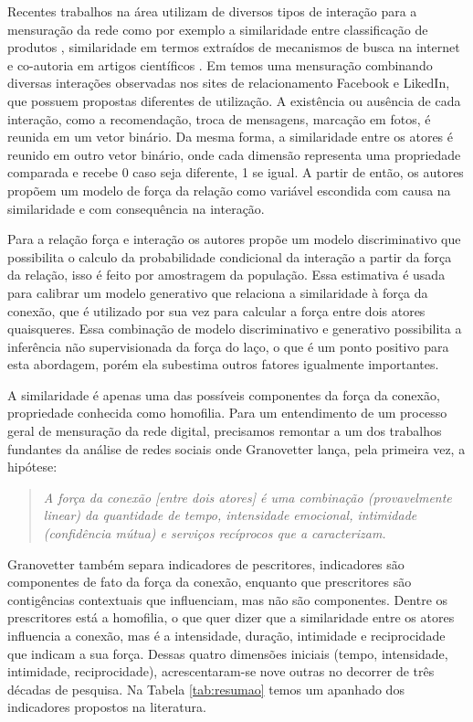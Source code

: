 \documentclass{article}
\begin{document}
Recentes trabalhos na área utilizam de diversos tipos de interação para a
mensuração da rede como por exemplo a similaridade entre classificação de
produtos \cite{Richardson2002}, similaridade em termos extraídos de mecanismos de
busca na internet \cite{MATSUO2007} e co-autoria em artigos científicos
\cite{Kempe2003}. Em \cite{Xiang2010} temos uma mensuração combinando diversas
interações observadas nos sites de relacionamento Facebook e LikedIn, que
possuem propostas diferentes de utilização. A existência ou ausência de cada
interação, como a recomendação, troca de mensagens, marcação em fotos, é reunida
em um vetor binário. Da mesma forma, a similaridade entre os atores é reunido em
outro vetor binário, onde cada dimensão representa uma propriedade comparada e
recebe 0 caso seja diferente, 1 se igual. A partir de então, os autores propõem
um modelo de força da relação como variável escondida com causa na similaridade
e com consequência na interação. 

Para a relação força e interação os autores propõe um modelo discriminativo que
possibilita o calculo da probabilidade condicional da interação a partir da
força da relação, isso é feito por amostragem da população. Essa estimativa é
usada para calibrar um modelo generativo que relaciona a similaridade à força da
conexão, que é utilizado por sua vez para calcular a força entre dois atores
quaisqueres. Essa combinação de modelo discriminativo e generativo possibilita a
inferência não supervisionada da força do laço, o que é um ponto positivo para
esta abordagem, porém ela subestima outros fatores igualmente importantes.

A similaridade é apenas uma das possíveis componentes da força da conexão,
propriedade conhecida como homofilia. Para um entendimento de um processo geral
de mensuração da rede digital, precisamos remontar a um dos trabalhos fundantes
da análise de redes sociais onde Granovetter lança, pela primeira vez, a
hipótese:

\begin{quotation}\textit{
A força da conexão [entre dois atores] é uma combinação
(provavelmente linear) da quantidade de tempo, intensidade emocional,
intimidade (confidência mútua) e serviços recíprocos que a
caracterizam.} \cite{Granovetter1973}
\end{quotation}

Granovetter também separa indicadores de pescritores, indicadores são
componentes de fato da força da conexão, enquanto que prescritores são
contigências contextuais que influenciam, mas não são componentes. Dentre os
prescritores está a homofilia, o que quer dizer que a similaridade entre os
atores influencia a conexão, mas é a intensidade, duração, intimidade e
reciprocidade que indicam a sua força. Dessas quatro dimensões iniciais
(tempo, intensidade, intimidade, reciprocidade), acrescentaram-se nove outras no
decorrer de três décadas de pesquisa. Na Tabela \ref{tab:resumao} temos um
apanhado dos indicadores propostos na literatura. 
\end{document}
